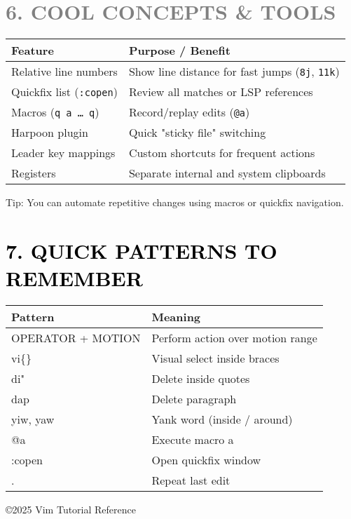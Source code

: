 \documentclass[landscape,11pt]{article}
\begin{document}
\begin{multicols}{2}
\section*{\textcolor{Gray}{6. COOL CONCEPTS \& TOOLS}}
\renewcommand{\arraystretch}{1.1}
\begin{tabularx}{\linewidth}{@{}l>{\raggedright\arraybackslash}X@{}}
\textbf{Feature} & \textbf{Purpose / Benefit}\\
\hline
Relative line numbers & Show line distance for fast jumps (\texttt{8j}, \texttt{11k})\\
Quickfix list (\texttt{:copen}) & Review all matches or LSP references\\
Macros (\texttt{q a … q}) & Record/replay edits (\texttt{@a})\\
Harpoon plugin & Quick "sticky file" switching \\
Leader key mappings & Custom shortcuts for frequent actions\\
Registers & Separate internal and system clipboards\\
\end{tabularx}
\renewcommand{\arraystretch}{1}

\vspace{2mm}
\begin{tcolorbox}[colback=Gray!15, colframe=Gray, boxsep=2pt, arc=1pt, fontupper=\small\itshape]
Tip: You can automate repetitive changes using macros or quickfix navigation.
\end{tcolorbox}

\section*{\textcolor{Black}{7. QUICK PATTERNS TO REMEMBER}}
\renewcommand{\arraystretch}{1.1}
\begin{tabularx}{\linewidth}{@{}>{\ttfamily}l>{\raggedright\arraybackslash}X@{}}
\normalfont\textbf{Pattern} & \textbf{Meaning}\\
\hline
OPERATOR + MOTION & Perform action over motion range\\
vi\{\} & Visual select inside braces\\
di" & Delete inside quotes\\
dap & Delete paragraph\\
yiw, yaw & Yank word (inside / around)\\
@a & Execute macro a\\
:copen & Open quickfix window\\
. & Repeat last edit\\
\end{tabularx}
\renewcommand{\arraystretch}{1}

\vfill
\begin{center}
{\small ©2025 Vim Tutorial Reference}
\end{center}

\end{multicols}
\end{document}

